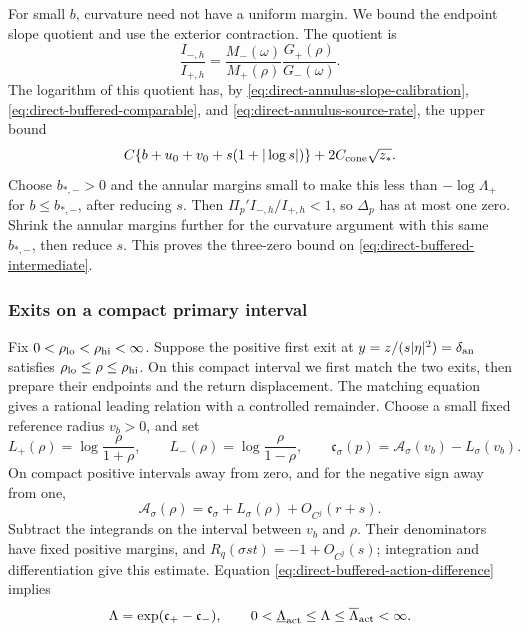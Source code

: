For small \(b\), curvature need not have a uniform margin. We bound the
endpoint slope quotient and use the exterior contraction. The quotient is
\[
 \frac{I_{-,h}}{I_{+,h}}
       =\frac{M_-(\omega)}{M_+(\rho)}
                         \frac{G_+(\rho)}{G_-(\omega)}.
\]
The logarithm of this quotient has, by
\eqref{eq:direct-annulus-slope-calibration},
\eqref{eq:direct-buffered-comparable}, and
\eqref{eq:direct-annulus-source-rate}, the upper bound
\[
 C\{b+u_0+v_0+s(1+|\log s|)\}
       +2C_{\rm cone}\sqrt{z_*}.
\]
Choose \(b_{*,-}>0\) and the annular margins small to make this less than
\(-\log\Lambda_+\) for \(b\le b_{*,-}\), after reducing \(s\).
Then \(\Pi_p'I_{-,h}/I_{+,h}<1\), so \(\Delta_p\) has at most
one zero. Shrink the annular margins further for the curvature
argument with this same \(b_{*,-}\), then reduce \(s\).
This proves the three-zero bound on
\eqref{eq:direct-buffered-intermediate}.

\subsubsection{Exits on a compact primary interval}
\label{sec:direct-buffered-compact-primary}

Fix \(0<\rho_{\rm lo}<\rho_{\rm hi}<\infty\). Suppose the positive first exit
at \(y=z/(s|\eta|^2)=\delta_{\rm an}\) satisfies \(\rho_{\rm lo}\le\rho\le\rho_{\rm hi}\).
On this compact interval we first match the two exits, then prepare their
endpoints and the return displacement. The matching equation gives a
rational leading relation with a controlled remainder.
Choose a small fixed reference radius \(v_b>0\), and set
\[
 L_+(\rho)=\log\frac{\rho}{1+\rho},\qquad
 L_-(\rho)=\log\frac{\rho}{1-\rho},\qquad
 \mathfrak c_\sigma(p)=\mathcal A_\sigma(v_b)-L_\sigma(v_b).
\]
On compact positive intervals away from zero, and for
the negative sign away from one,
\begin{equation}
\label{eq:direct-buffered-primary-action}
 \mathcal A_\sigma(\rho)
       =\mathfrak c_\sigma+L_\sigma(\rho)+O_{C^j}(r+s).
\end{equation}
Subtract the integrands on the interval between \(v_b\)
and \(\rho\). Their denominators have fixed positive
margins, and \(R_q(\sigma st)=-1+O_{C^j}(s)\);
integration and differentiation give this estimate.
Equation \eqref{eq:direct-buffered-action-difference} implies
\[
 \Lambda=\exp(\mathfrak c_+-\mathfrak c_-),\qquad
 0<\underline\Lambda_{\rm act}\le\Lambda
     \le\overline\Lambda_{\rm act}<\infty.
\]

